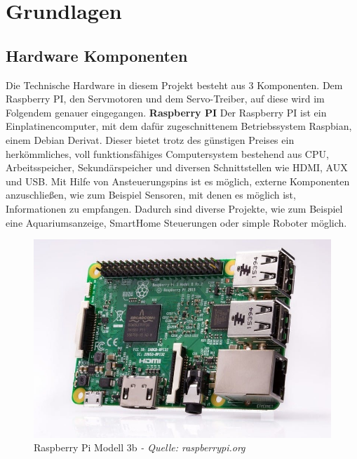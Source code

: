 \documentclass[12pt,					%
							 oneside,			%
							 a4paper,			%
							 halfparskip,		%
							 liststotoc,			%
							 bibtotoc,			%
							 fleqn,				%
							 pointlessnumbers]	%
							 {scrreprt}
\begin{document}
\chapter{Grundlagen}
\section{Hardware Komponenten}
Die Technische Hardware in diesem Projekt besteht aus 3 Komponenten. Dem Raspberry PI, den Servmotoren und dem Servo-Treiber, auf diese wird im Folgendem genauer eingegangen. \newline \newline
\textbf{Raspberry PI} \newline
Der Raspberry PI  ist ein Einplatinencomputer, mit dem dafür zugeschnittenem Betriebssystem \glqq{}Raspbian\grqq{}, einem Debian Derivat. Dieser bietet trotz des günstigen Preises ein herkömmliches, voll funktionsfähiges Computersystem bestehend aus CPU, Arbeitsspeicher, Sekundärspeicher und diversen Schnittstellen wie HDMI, AUX und USB. Mit Hilfe von Ansteuerungspins ist es möglich, externe Komponenten anzuschließen, wie zum Beispiel Sensoren, mit denen es möglich ist, Informationen zu empfangen. Dadurch sind diverse Projekte, wie zum Beispiel eine Aquariumsanzeige, SmartHome Steuerungen oder simple  \glqq{}Roboter \glqq{} möglich.\newline\newline
\begin{figure}[h!]
	\centering
	\includegraphics[scale=0.55]{pictures/raspberryPi3b.jpg}
	\caption{Raspberry Pi Modell 3b \textit{- Quelle: raspberrypi.org\cite{Foundation2020}}}
\end{figure}
\end{document}
